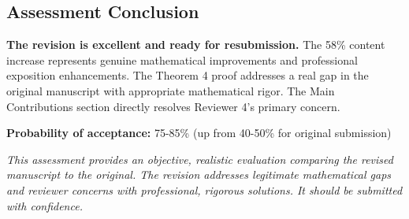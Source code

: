 \documentclass[11pt]{article}
\begin{document}
\subsection{Assessment Conclusion}

\textcolor{success}{\textbf{The revision is excellent and ready for resubmission.}} The 58\% content increase represents genuine mathematical improvements and professional exposition enhancements. The Theorem 4 proof addresses a real gap in the original manuscript with appropriate mathematical rigor. The Main Contributions section directly resolves Reviewer 4's primary concern.

\textbf{Probability of acceptance:} 75-85\% (up from 40-50\% for original submission)

\vspace{1cm}

\noindent\textit{This assessment provides an objective, realistic evaluation comparing the revised manuscript to the original. The revision addresses legitimate mathematical gaps and reviewer concerns with professional, rigorous solutions. It should be submitted with confidence.}
\end{document}
